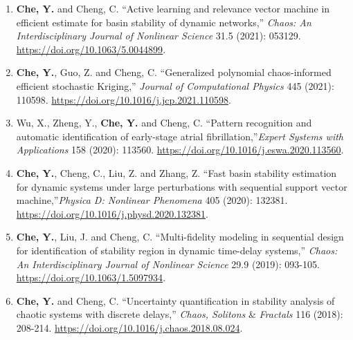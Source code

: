 \documentclass[10pt]{article}
\begin{document}
\begin{enumerate}
	\item {\bf Che, Y.} and Cheng, C. ``Active learning and relevance vector machine in efficient estimate for basin stability of dynamic networks,'' \textit{Chaos: An Interdisciplinary Journal of Nonlinear Science} 31.5 (2021): 053129. \url{https://doi.org/10.1063/5.0044899}.

	\item {\bf Che, Y.}, Guo, Z. and Cheng, C. ``Generalized polynomial chaos-informed efficient stochastic Kriging,'' \textit{Journal of Computational Physics} 445 (2021): 110598. \url{https://doi.org/10.1016/j.jcp.2021.110598}.

	\item Wu, X., Zheng, Y., {\bf Che, Y.} and Cheng, C. ``Pattern recognition and automatic identification of early-stage atrial fibrillation,''\textit{Expert Systems with Applications} 158 (2020): 113560. \url{https://doi.org/10.1016/j.eswa.2020.113560}.

	\item {\bf Che, Y.}, Cheng, C., Liu, Z. and Zhang, Z. ``Fast basin stability estimation for dynamic systems under large perturbations with sequential support vector machine,''\textit{Physica D: Nonlinear Phenomena} 405 (2020): 132381. \url{https://doi.org/10.1016/j.physd.2020.132381}.

	\item {\bf Che, Y.}, Liu, J.  and Cheng, C. ``Multi-fidelity modeling in sequential design for identification of stability region in dynamic time-delay systems,''  \textit{Chaos: An Interdisciplinary Journal of Nonlinear Science} 29.9 (2019): 093-105. \url{https://doi.org/10.1063/1.5097934}.

	\item {\bf Che, Y.} and Cheng, C. ``Uncertainty quantification in stability analysis of chaotic systems with discrete delays,'' \textit{Chaos, Solitons} \& \textit{Fractals} 116 (2018): 208-214. \url{https://doi.org/10.1016/j.chaos.2018.08.024}.
\end{enumerate}
\end{document}
